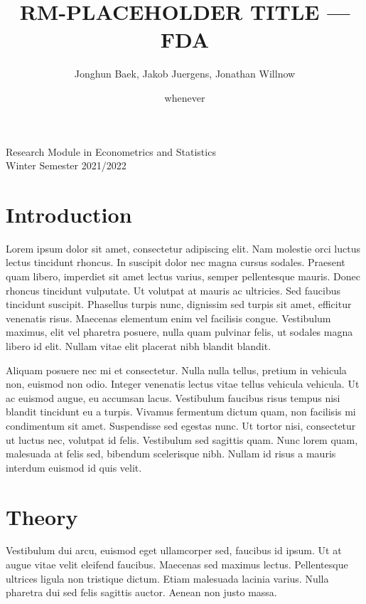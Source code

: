 \documentclass[11pt,twoside,a4paper]{article}
\begin{document}
	\title{{\LARGE RM-PLACEHOLDER TITLE — FDA}}
	\author{Jonghun Baek, Jakob Juergens, Jonathan Willnow}
	\date{whenever}
	\maketitle
	\vspace{1.5 cm}
	\begin{center}
		Research Module in Econometrics and Statistics \\
		Winter Semester 2021/2022
	\end{center}
	
	\newpage
	
	\tableofcontents
	
	\newpage
	
	\section{Introduction}
	Lorem ipsum dolor sit amet, consectetur adipiscing elit. Nam molestie orci luctus lectus tincidunt rhoncus. In suscipit dolor nec magna cursus sodales. Praesent quam libero, imperdiet sit amet lectus varius, semper pellentesque mauris. Donec rhoncus tincidunt vulputate. Ut volutpat at mauris ac ultricies. Sed faucibus tincidunt suscipit. Phasellus turpis nunc, dignissim sed turpis sit amet, efficitur venenatis risus. Maecenas elementum enim vel facilisis congue. Vestibulum maximus, elit vel pharetra posuere, nulla quam pulvinar felis, ut sodales magna libero id elit. Nullam vitae elit placerat nibh blandit blandit.
	
	Aliquam posuere nec mi et consectetur. Nulla nulla tellus, pretium in vehicula non, euismod non odio. Integer venenatis lectus vitae tellus vehicula vehicula. Ut ac euismod augue, eu accumsan lacus. Vestibulum faucibus risus tempus nisi blandit tincidunt eu a turpis. Vivamus fermentum dictum quam, non facilisis mi condimentum sit amet. Suspendisse sed egestas nunc. Ut tortor nisi, consectetur ut luctus nec, volutpat id felis. Vestibulum sed sagittis quam. Nunc lorem quam, malesuada at felis sed, bibendum scelerisque nibh. Nullam id risus a mauris interdum euismod id quis velit.
	
	\section{Theory}
	Vestibulum dui arcu, euismod eget ullamcorper sed, faucibus id ipsum. Ut at augue vitae velit eleifend faucibus. Maecenas sed maximus lectus. Pellentesque ultrices ligula non tristique dictum. Etiam malesuada lacinia varius. Nulla pharetra dui sed felis sagittis auctor. Aenean non justo massa.
	
\end{document}
